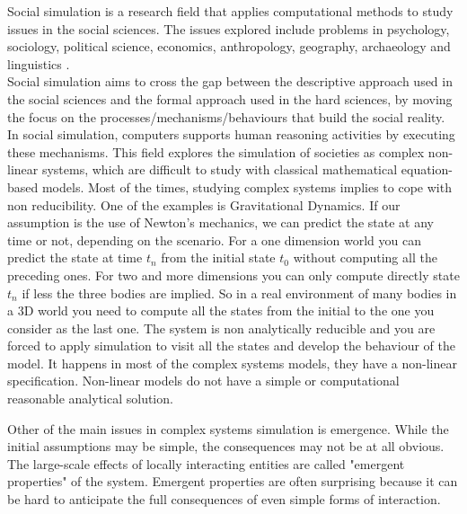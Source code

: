 \documentclass[11pt,oneside,a4paper,openright]{report}
\begin{document}

Social simulation is a research field that applies computational methods to study issues in the social sciences. The issues explored include problems in psychology, sociology, political science, economics, anthropology, geography, archaeology and linguistics \cite{TakahashiSallachRouchier2007}.\\
Social simulation aims to cross the gap between the descriptive approach used in the social sciences and the formal approach used in the hard sciences, by moving the focus on the processes/mechanisms/behaviours that build the social reality.\\
In social simulation, computers supports human reasoning activities by executing these mechanisms. This field explores the simulation of societies as complex non-linear systems, which are difficult to study with classical mathematical equation-based models.
Most of the times, studying complex systems implies to cope with non reducibility. One of the examples is Gravitational Dynamics. If our assumption is the use of Newton's mechanics, we can predict the state at any time or not, depending on the scenario. For a one dimension world you can predict the state at time $t_n$ from the initial state $t_0$ without computing all the preceding ones. For two and more dimensions you can only compute directly state $t_n$ if less the three bodies are implied. So in a real environment of many bodies in a 3D world you need to compute all the states from the initial to the one you consider as the last one. The system is non analytically reducible and you are forced to apply simulation to visit all the states and develop the behaviour of the model. It happens in most of the complex systems models, they have a non-linear specification. Non-linear models do not have a simple or computational reasonable analytical solution. 

Other of the main issues in complex systems simulation is emergence. While the initial assumptions may be simple, the consequences may not be at all obvious. The large-scale effects of locally interacting entities are called "emergent properties" of the system. Emergent properties are often surprising because it can be hard to anticipate the full consequences of even simple forms of interaction. 
\end{document}
